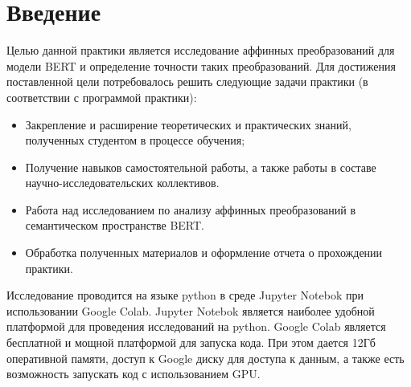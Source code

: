 \documentclass[a4paper,14pt]{article}
\begin{document}
\captionsetup[figure]{labelformat=simple, labelsep=endash}
	 
	
	\tableofcontents
	
	\pagebreak
	
	
	
	
	
	
	
	
	
	\section{Введение}
	
	Целью данной практики является исследование аффинных преобразований  для модели BERT и определение точности таких преобразований.
	Для достижения поставленной цели потребовалось решить следующие задачи практики (в соответствии с программой практики):
	
	\begin{itemize}
	
		\item Закрепление и расширение теоретических и практических знаний, полученных студентом в процессе обучения;
		
		\item Получение навыков самостоятельной работы, а также работы в составе научно-исследовательских коллективов.
		
		\item Работа над исследованием по анализу аффинных преобразований в семантическом пространстве BERT.
		
		\item Обработка полученных материалов и оформление отчета о прохождении практики.
			
	\end{itemize}

	Исследование проводится на языке python в среде Jupyter Notebok при использовании Google Colab. Jupyter Notebok является наиболее удобной платформой для проведения исследований на python.
	Google Colab является бесплатной и мощной платформой для запуска кода.
	При этом дается 12Гб оперативной памяти, доступ к Google диску для доступа к данным, а также есть возможность запускать код с использованием GPU.
	
\end{document}
